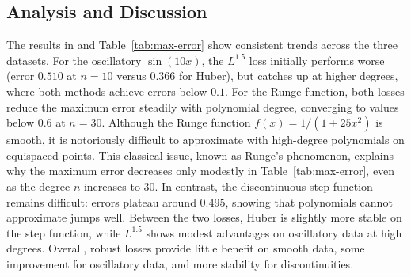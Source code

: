\documentclass[a4paper,12pt]{article}
\begin{document}
\subsection*{Analysis and Discussion}
The results in  and Table~\ref{tab:max-error} 
show consistent trends across the three datasets. 
For the oscillatory $\sin(10x)$, the $L^{1.5}$ loss initially performs worse (error $0.510$ at 
$n=10$ versus $0.366$ for Huber), but catches up at higher degrees, where 
both methods achieve errors below $0.1$. 
For the Runge function, both losses reduce the maximum error steadily with polynomial 
degree, converging to values below $0.6$ at $n=30$. Although the Runge function $f(x)=1/(1+25x^2)$ is smooth, it is notoriously difficult to approximate with high-degree polynomials on equispaced points. This classical issue, known as Runge's phenomenon, explains why the maximum error decreases only modestly in Table~\ref{tab:max-error}, even as the degree $n$ increases to 30.
In contrast, the discontinuous step function remains difficult: errors plateau around $0.495$, showing that polynomials cannot approximate jumps well. Between the two losses, Huber 
is slightly more stable on the step function, while $L^{1.5}$ shows modest  advantages on oscillatory data at high degrees. Overall, robust losses  provide little benefit on smooth data, some improvement for oscillatory data, and more stability for discontinuities.


    
    
\end{document}

